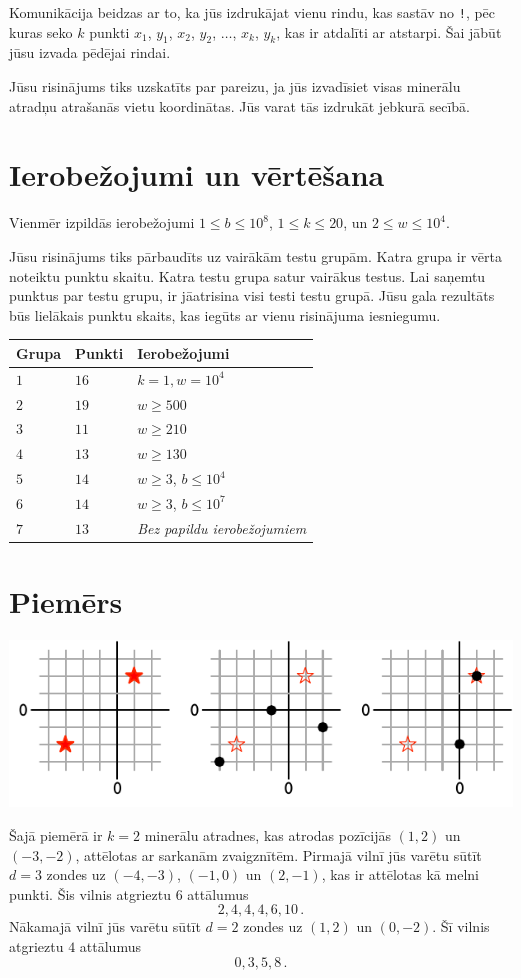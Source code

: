 Komunikācija beidzas ar to, ka jūs izdrukājat vienu rindu, kas sastāv no \texttt{!}, pēc kuras seko $k$ punkti $x_1$, $y_1$, $x_2$, $y_2$, $\ldots$, $x_k$, $y_k$, kas ir atdalīti ar atstarpi.
Šai jābūt jūsu izvada pēdējai rindai.

Jūsu risinājums tiks uzskatīts par pareizu, ja jūs izvadīsiet visas minerālu atradņu atrašanās vietu koordinātas.
Jūs varat tās izdrukāt jebkurā secībā.

\section*{Ierobežojumi un vērtēšana}

Vienmēr izpildās ierobežojumi
$1\leq b \leq 10^8$, %
$1 \leq k \leq 20$, %
un
$2 \le w \le 10^4$. %

Jūsu risinājums tiks pārbaudīts uz vairākām testu grupām. Katra grupa ir vērta noteiktu punktu skaitu.
Katra testu grupa satur vairākus testus.
Lai saņemtu punktus par testu grupu, ir jāatrisina visi testi testu grupā.
Jūsu gala rezultāts būs lielākais punktu skaits, kas iegūts ar vienu risinājuma iesniegumu.

\medskip
\begin{tabular}{lll}
Grupa & Punkti & Ierobežojumi \\\hline
  $1$ & $16$ & $k = 1, w = 10^4$\\
  $2$ & $19$ & $w \ge 500$\\
  $3$ & $11$ & $w \ge 210$\\
  $4$ & $13$ & $w \ge 130$\\
  $5$ & $14$ & $w \ge 3$, $b \le 10^4$\\
  $6$ & $14$ & $w \ge 3$, $b \le 10^7$\\
  $7$ & $13$ & \emph{Bez papildu ierobežojumiem}
\end{tabular}

\section*{Piemērs}

\includegraphics[width=.6\textwidth]{img/sample1.pdf}

Šajā piemērā ir $k=2$ minerālu atradnes, kas atrodas pozīcijās $(1,2)$ un $(-3,-2)$, attēlotas ar sarkanām zvaigznītēm.
Pirmajā vilnī jūs varētu sūtīt $d=3$ zondes uz $(-4,-3)$, $(-1, 0)$ un $(2,-1)$, kas ir attēlotas kā melni punkti.
Šis vilnis atgrieztu $6$ attālumus \[
  2, 4, 4, 4, 6, 10\,.
\]
Nākamajā vilnī jūs varētu sūtīt $d=2$ zondes uz $(1,2)$ un $(0,-2)$.
Šī vilnis atgrieztu $4$ attālumus \[
  0, 3, 5, 8\,.
\]
